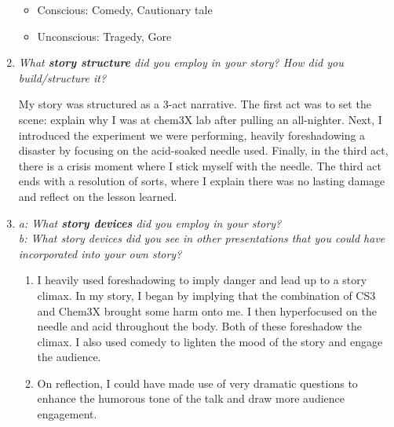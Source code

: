 \documentclass{article}
\newcommand{\ans}[1]{\color{blue} #1 \color{black}}
\begin{document}
\begin{enumerate}
            \ans{
                \begin{itemize}
                    \item Conscious: Comedy, Cautionary tale
                    \item Unconscious: Tragedy, Gore
                \end{itemize}
                \hfill
            }

        \pagebreak

        \item \emph{What \textbf{story structure} did you employ in your story?
              How did you build/structure it?}
            
            \ans{
                My story was structured as a 3-act narrative. The first act was
                to set the scene: explain why I was at chem3X lab after pulling
                an all-nighter. Next, I introduced the experiment we were
                performing, heavily foreshadowing a disaster by focusing on the
                acid-soaked needle used. Finally, in the third act, there is a 
                crisis moment where I stick myself with the needle. The third
                act ends with a resolution of sorts, where I explain there was
                no lasting damage and reflect on the lesson learned. 
            }

        \item \emph{a: What \textbf{story devices} did you employ in your
                       story? \\
                    b: What story devices did you see in other presentations
                       that you could have incorporated into your own story?}

            \ans{
                \begin{enumerate}
                    \item I heavily used foreshadowing to imply danger and lead
                          up to a story climax. In my story, I began by 
                          implying that the combination of CS3 and Chem3X
                          brought some harm onto me. I then hyperfocused on the
                          needle and acid throughout the body. Both of these 
                          foreshadow the climax. I also used comedy to lighten
                          the mood of the story and engage the audience.
                    \item On reflection, I could have made use of very dramatic 
                          questions to enhance the humorous tone of the talk and
                          draw more audience engagement.
                \end{enumerate}
                \hfill
            }


\end{enumerate}
\end{document}
